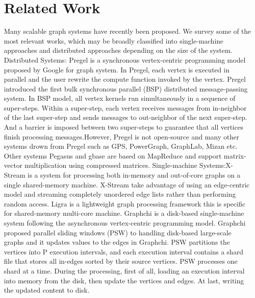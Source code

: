 \documentclass[twocolumn,a4paper,10pt]{article}
\begin{document}
\section{Related Work}
Many scalable graph systems have recently been proposed. We survey some of the most relevant works, which may be broadly classified into single-machine approaches and distributed approaches depending on the size of the system.
\newline
Distributed Systems: Pregel is a synchronous vertex-centric programming model proposed by Google for graph system. In Pregel, each vertex is executed in parallel and the user rewrite the compute function invoked by the vertex. Pregel introduced the first bulk synchronous parallel (BSP) distributed message-passing system. In BSP model, all vertex kernels run simultaneously in a sequence of super-steps. Within a super-step, each vertex receives messages from in-neighbor of the last super-step and sends messages to out-neighbor of the next super-step. And a barrier is imposed between two super-steps to guarantee that all vertices finish processing messages.However, Pregel is not open-source and many other systems drown from Pregel such as GPS, PowerGraph, GraphLab, Mizan etc. Other systems Pegasus and gbase are based on MapReduce and support matrix-vector multiplication using compressed matrices.
\newline
Single-machine Systems:X-Stream is a system for processing both in-memory and out-of-core graphs on a single shared-memory machine. X-Stream take advantage of using an edge-centric model and streaming completely unordered edge lists rather than performing random access.  Ligra is a lightweight graph processing framework this is specific for shared-memory multi-core machine. Graphchi is a disk-based single-machine system following the asynchronous vertex-centric programming model. Graphchi proposed parallel sliding windows (PSW) to handling disk-based large-scale graphs and it updates values to the edges in Graphchi. PSW partitions the vertices into P execution intervals, and each execution interval contains a shard file that stores all in-edges sorted by their source vertices. PSW processes one shard at a time. During the processing, first of all, loading an execution interval into memory from the disk, then update the vertices and edges. At last, writing the updated content to disk.
\end{document}

